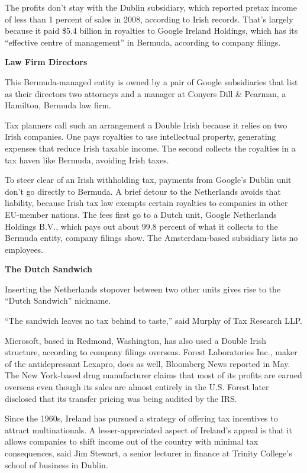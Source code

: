 \begin{select}
The profits don't stay with the Dublin subsidiary, which reported pretax income of less than 1 percent of sales in 2008, according to Irish records. That's largely because it paid \$5.4 billion in royalties to Google Ireland Holdings, which has its ``effective centre of management'' in Bermuda, according to company filings.

\begin{center} \textbf{Law Firm Directors}
\end{center}

This Bermuda-managed entity is owned by a pair of Google subsidiaries that list as their directors two attorneys and a manager at Conyers Dill \& Pearman, a Hamilton, Bermuda law firm.

Tax planners call such an arrangement a Double Irish because it relies on two Irish companies. One pays royalties to use intellectual property, generating expenses that reduce Irish taxable income. The second collects the royalties in a tax haven like Bermuda, avoiding Irish taxes.

To steer clear of an Irish withholding tax, payments from Google's Dublin unit don't go directly to Bermuda. A brief detour to the Netherlands avoids that liability, because Irish tax law exempts certain royalties to companies in other EU-member nations. The fees first go to a Dutch unit, Google Netherlands Holdings B.V., which pays out about 99.8 percent of what it collects to the Bermuda entity, company filings show. The Amsterdam-based subsidiary lists no employees.

\begin{center} \textbf{The Dutch Sandwich}
\end{center}

Inserting the Netherlands stopover between two other units gives rise to the ``Dutch Sandwich'' nickname.

``The sandwich leaves no tax behind to taste,'' said Murphy of Tax Research LLP.

Microsoft, based in Redmond, Washington, has also used a Double Irish structure, according to company filings overseas. Forest Laboratories Inc., maker of the antidepressant Lexapro, does as well, Bloomberg News reported in May. The New York-based drug manufacturer claims that most of its profits are earned overseas even though its sales are almost entirely in the U.S. Forest later disclosed that its transfer pricing was being audited by the IRS.

Since the 1960s, Ireland has pursued a strategy of offering tax incentives to attract multinationals. A lesser-appreciated aspect of Ireland's appeal is that it allows companies to shift income out of the country with minimal tax consequences, said Jim Stewart, a senior lecturer in finance at Trinity College's school of business in Dublin.


\end{select}

